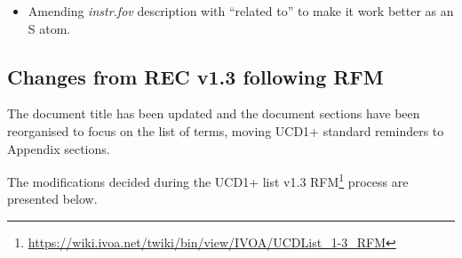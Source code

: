 \documentclass[11pt,a4paper]{ivoa}
\begin{document}
\begin{itemize}
\item Amending \emph{instr.fov} description with ``related to'' to make
it work better as an S atom.
\end{itemize}


\subsection{Changes from REC v1.3 following RFM}
The document title has been updated and the document sections have been reorganised to focus on 
the list of terms, moving UCD1+ standard reminders to Appendix sections. 

The modifications decided during the UCD1+ list v1.3 
RFM\footnote{\url{https://wiki.ivoa.net/twiki/bin/view/IVOA/UCDList_1-3_RFM}} process are presented below.

\end{document}
